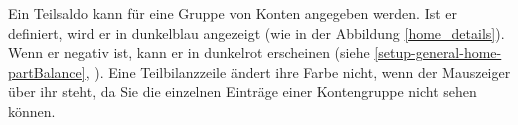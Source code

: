 Ein Teilsaldo kann für eine Gruppe von Konten angegeben werden. Ist er definiert, wird er in \textcolor[RGB]{40,40,255}{dunkelblau} angezeigt (wie in der Abbildung \vref{home_details}). Wenn er negativ ist, kann er in \textcolor[RGB]{153,0,0}{dunkelrot} erscheinen (siehe \vref{setup-general-home-partBalance}, ). Eine Teilbilanzzeile ändert ihre Farbe nicht, wenn der Mauszeiger über ihr steht, da Sie die einzelnen Einträge einer Kontengruppe nicht sehen können.%

